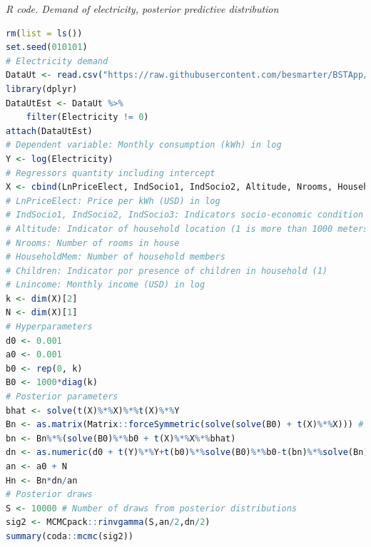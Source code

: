 \begin{tcolorbox}[enhanced,width=4.67in,center upper,
	fontupper=\large\bfseries,drop shadow southwest,sharp corners]
	\textit{R code. Demand of electricity, posterior predictive distribution}
	\begin{VF}
		\begin{lstlisting}[language=R]
rm(list = ls())
set.seed(010101)
# Electricity demand
DataUt <- read.csv("https://raw.githubusercontent.com/besmarter/BSTApp/refs/heads/master/DataApp/Utilities.csv", sep = ",", header = TRUE, quote = "")
library(dplyr)
DataUtEst <- DataUt %>% 
	filter(Electricity != 0)
attach(DataUtEst)
# Dependent variable: Monthly consumption (kWh) in log
Y <- log(Electricity) 
# Regressors quantity including intercept
X <- cbind(LnPriceElect, IndSocio1, IndSocio2, Altitude, Nrooms, HouseholdMem, Children, Lnincome, 1)
# LnPriceElect: Price per kWh (USD) in log
# IndSocio1, IndSocio2, IndSocio3: Indicators socio-economic condition (1) is the lowest and (3) the highest
# Altitude: Indicator of household location (1 is more than 1000 meters above sea level)
# Nrooms: Number of rooms in house
# HouseholdMem: Number of household members
# Children: Indicator por presence of children in household (1)
# Lnincome: Monthly income (USD) in log
k <- dim(X)[2]
N <- dim(X)[1]
# Hyperparameters
d0 <- 0.001
a0 <- 0.001
b0 <- rep(0, k)
B0 <- 1000*diag(k)
# Posterior parameters
bhat <- solve(t(X)%*%X)%*%t(X)%*%Y
Bn <- as.matrix(Matrix::forceSymmetric(solve(solve(B0) + t(X)%*%X))) # Force this matrix to be symmetric
bn <- Bn%*%(solve(B0)%*%b0 + t(X)%*%X%*%bhat)
dn <- as.numeric(d0 + t(Y)%*%Y+t(b0)%*%solve(B0)%*%b0-t(bn)%*%solve(Bn)%*%bn)
an <- a0 + N
Hn <- Bn*dn/an
# Posterior draws
S <- 10000 # Number of draws from posterior distributions
sig2 <- MCMCpack::rinvgamma(S,an/2,dn/2)
summary(coda::mcmc(sig2))
\end{lstlisting}
	\end{VF}
\end{tcolorbox} 


